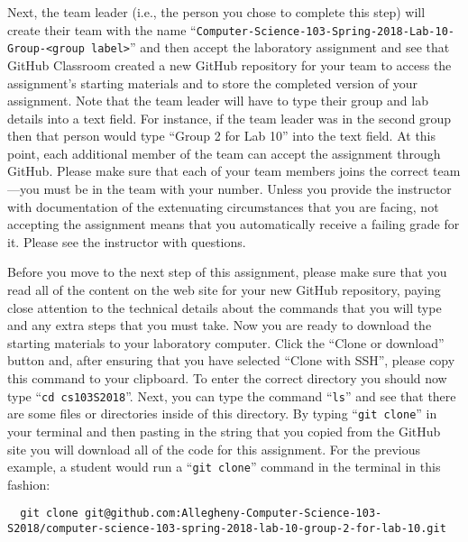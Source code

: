 \documentclass[11pt]{article}
\newcommand{\command}[1]{``\lstinline{#1}''}
\begin{document}
Next, the team leader (i.e., the person you chose to complete this step) will
create their team with the name
\command{Computer-Science-103-Spring-2018-Lab-10-Group-<group label>} and then
accept the laboratory assignment and see that GitHub Classroom created a new
GitHub repository for your team to access the assignment's starting materials
and to store the completed version of your assignment. Note that the team leader
will have to type their group and lab details into a text field. For instance,
if the team leader was in the second group then that person would type ``Group 2
for Lab 10'' into the text field. At this point, each additional member of the
team can accept the assignment through GitHub. Please make sure that each of
your team members joins the correct team---you must be in the team with your
number. Unless you provide the instructor with documentation of the extenuating
circumstances that you are facing, not accepting the assignment means that you
automatically receive a failing grade for it. Please see the instructor with
questions.

Before you move to the next step of this assignment, please make sure that you
read all of the content on the web site for your new GitHub repository, paying
close attention to the technical details about the commands that you will type
and any extra steps that you must take. Now you are ready to download the
starting materials to your laboratory computer. Click the ``Clone or download''
button and, after ensuring that you have selected ``Clone with SSH'', please
copy this command to your clipboard. To enter the correct directory you should
now type \command{cd cs103S2018}. Next, you can type the command \command{ls}
and see that there are some files or directories inside of this directory. By
typing \command{git clone} in your terminal and then pasting in the string that
you copied from the GitHub site you will download all of the code for this
assignment. For the previous example, a student would run a \command{git clone}
command in the terminal in this fashion:

\begin{lstlisting}
  git clone git@github.com:Allegheny-Computer-Science-103-S2018/computer-science-103-spring-2018-lab-10-group-2-for-lab-10.git
\end{lstlisting}
\end{document}
